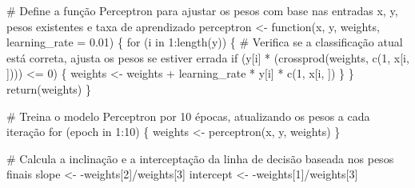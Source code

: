 \documentclass[
  a4paperpaper,
]{article}
\newenvironment{Shaded}{\begin{snugshade}}{\end{snugshade}}
\newcommand{\AttributeTok}[1]{\textcolor[rgb]{0.40,0.45,0.13}{#1}}
\newcommand{\CommentTok}[1]{\textcolor[rgb]{0.37,0.37,0.37}{#1}}
\newcommand{\ControlFlowTok}[1]{\textcolor[rgb]{0.00,0.23,0.31}{#1}}
\newcommand{\DecValTok}[1]{\textcolor[rgb]{0.68,0.00,0.00}{#1}}
\newcommand{\FloatTok}[1]{\textcolor[rgb]{0.68,0.00,0.00}{#1}}
\newcommand{\FunctionTok}[1]{\textcolor[rgb]{0.28,0.35,0.67}{#1}}
\newcommand{\NormalTok}[1]{\textcolor[rgb]{0.00,0.23,0.31}{#1}}
\newcommand{\OtherTok}[1]{\textcolor[rgb]{0.00,0.23,0.31}{#1}}
\newcommand{\SpecialCharTok}[1]{\textcolor[rgb]{0.37,0.37,0.37}{#1}}
\begin{document}
\begin{Shaded}
\begin{Highlighting}[]
\CommentTok{\# Define a função Perceptron para ajustar os pesos com base nas entradas \textquotesingle{}x\textquotesingle{}, \textquotesingle{}y\textquotesingle{}, pesos existentes e taxa de aprendizado}
\NormalTok{perceptron }\OtherTok{\textless{}{-}} \ControlFlowTok{function}\NormalTok{(x, y, weights, }\AttributeTok{learning\_rate =} \FloatTok{0.01}\NormalTok{) \{}
  \ControlFlowTok{for}\NormalTok{ (i }\ControlFlowTok{in} \DecValTok{1}\SpecialCharTok{:}\FunctionTok{length}\NormalTok{(y)) \{}
    \CommentTok{\# Verifica se a classificação atual está correta, ajusta os pesos se estiver errada}
    \ControlFlowTok{if}\NormalTok{ (y[i] }\SpecialCharTok{*}\NormalTok{ (}\FunctionTok{crossprod}\NormalTok{(weights, }\FunctionTok{c}\NormalTok{(}\DecValTok{1}\NormalTok{, x[i, ]))) }\SpecialCharTok{\textless{}=} \DecValTok{0}\NormalTok{) \{}
\NormalTok{      weights }\OtherTok{\textless{}{-}}\NormalTok{ weights }\SpecialCharTok{+}\NormalTok{ learning\_rate }\SpecialCharTok{*}\NormalTok{ y[i] }\SpecialCharTok{*} \FunctionTok{c}\NormalTok{(}\DecValTok{1}\NormalTok{, x[i, ])}
\NormalTok{    \}}
\NormalTok{  \}}
  \FunctionTok{return}\NormalTok{(weights)}
\NormalTok{\}}

\CommentTok{\# Treina o modelo Perceptron por 10 épocas, atualizando os pesos a cada iteração}
\ControlFlowTok{for}\NormalTok{ (epoch }\ControlFlowTok{in} \DecValTok{1}\SpecialCharTok{:}\DecValTok{10}\NormalTok{) \{}
\NormalTok{  weights }\OtherTok{\textless{}{-}} \FunctionTok{perceptron}\NormalTok{(x, y, weights)}
\NormalTok{\}}

\CommentTok{\# Calcula a inclinação e a interceptação da linha de decisão baseada nos pesos finais}
\NormalTok{slope }\OtherTok{\textless{}{-}} \SpecialCharTok{{-}}\NormalTok{weights[}\DecValTok{2}\NormalTok{]}\SpecialCharTok{/}\NormalTok{weights[}\DecValTok{3}\NormalTok{]}
\NormalTok{intercept }\OtherTok{\textless{}{-}} \SpecialCharTok{{-}}\NormalTok{weights[}\DecValTok{1}\NormalTok{]}\SpecialCharTok{/}\NormalTok{weights[}\DecValTok{3}\NormalTok{]}
\end{Highlighting}
\end{Shaded}
\end{document}
